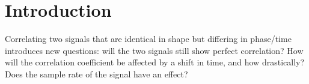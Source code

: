 \section{Introduction}

Correlating two signals that are identical in shape but differing in phase/time introduces new questions: will the two signals still show perfect correlation? How will the correlation coefficient be affected by a shift in time, and how drastically? Does the sample rate of the signal have an effect?